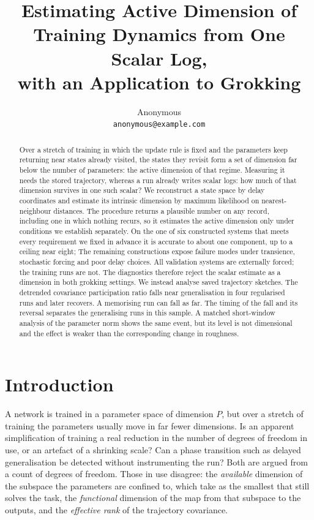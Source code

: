 \documentclass{article}
\title{Estimating Active Dimension of\\
Training Dynamics from One Scalar Log,\\
with an Application to Grokking}
\author{
  Anonymous\\
  \texttt{anonymous@example.com}\\
}
\begin{document}
\maketitle

\begin{abstract}
Over a stretch of training in which the update rule is fixed and the parameters keep returning near
states already visited, the states they revisit form a set of dimension far below the number of
parameters: the active dimension of that regime. Measuring it needs the
stored trajectory, whereas a run already writes scalar logs: how much of that dimension survives
in one such scalar? We reconstruct a state space by delay coordinates and estimate its
intrinsic dimension by maximum likelihood on nearest-neighbour distances. The procedure returns a
plausible number on any record, including one in which nothing recurs, so it estimates the
active dimension only under conditions we establish separately. On the one of six constructed systems that meets every
requirement we fixed in advance it is accurate to about one component, up to a ceiling near eight;
The remaining constructions expose failure modes under transience, stochastic forcing and poor
delay choices. All validation systems are externally forced; the training runs are not. The
diagnostics therefore reject the scalar estimate as a dimension in both grokking settings. We
instead analyse saved trajectory sketches. The detrended covariance participation ratio falls near
generalisation in four regularised runs and later recovers. A memorising run can fall as far. The
timing of the fall and its reversal separates the generalising runs in this sample. A matched
short-window analysis of the parameter norm shows the same event, but its level is not dimensional
and the effect is weaker than the corresponding change in roughness.
\end{abstract}

\section{Introduction}\label{sec:intro}

A network is trained in a parameter space of dimension $P$, but over a stretch of training the
parameters usually move in far fewer dimensions. Is an apparent simplification of training a real
reduction in the number of degrees of freedom in use, or an artefact of a shrinking scale? Can a
phase transition such as delayed generalisation be detected without instrumenting the run? Both are argued
from a count of degrees of freedom. Those in use disagree: the \emph{available} dimension
of the subspace the parameters are confined to, which \citet{li2018measuring} take as the smallest
that still solves the task, the \emph{functional} dimension of the map from that subspace to the
outputs, and the \emph{effective rank} of the trajectory covariance.
\end{document}
